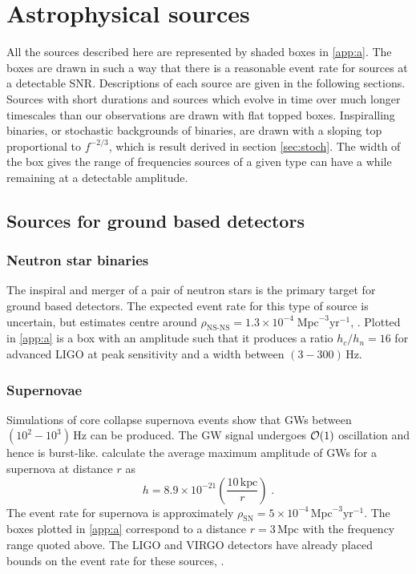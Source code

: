 \section{Astrophysical sources}\label{sec:sources}
All the sources described here are represented by shaded boxes in \ref{app:a}. The boxes are drawn in such a way that there is a reasonable event rate for sources at a detectable SNR. Descriptions of each source are given in the following sections. Sources with short durations and sources which evolve in time over much longer timescales than our observations are drawn with flat topped boxes. Inspiralling binaries, or stochastic backgrounds of binaries, are drawn with a sloping top proportional to $f^{-2/3}$, which is result derived in section \ref{sec:stoch}. The width of the box gives the range of frequencies sources of a given type can have a while remaining at a detectable amplitude.




\subsection{Sources for ground based detectors}

\subsubsection{Neutron star binaries}
The inspiral and merger of a pair of neutron stars is the primary target for ground based detectors. The expected event rate for this type of source is uncertain, but estimates centre around $\rho_{\textrm{NS-NS}}=1.3\times 10^{-4}\;\textrm{Mpc}^{-3}\textrm{yr}^{-1}$, \cite{CBC}. Plotted in \ref{app:a} is a box with an amplitude such that it produces a ratio $h_{c}/h_{n}=16$ for advanced LIGO at peak sensitivity and a width between $(3-300)\,\textrm{Hz}$.

\subsubsection{Supernovae}
Simulations of core collapse supernova events show that GWs between $(10^{2}-10^{3})\,\textrm{Hz}$ can be produced. The GW signal undergoes ${\cal{O}}(1)$ oscillation and hence is burst-like. \cite{2002A&A...393..523D} calculate the average maximum amplitude of GWs for a supernova at distance $r$ as
\begin{equation} h=8.9\times 10^{-21}\left( \frac{10 \,\textrm{kpc}}{r} \right) \; .\end{equation}
The event rate for supernova is approximately $\rho_{\textrm{SN}}=5\times10^{-4}\,\textrm{Mpc}^{-3}\textrm{yr}^{-1}$. The boxes plotted in \ref{app:a} correspond to a distance $r=3 \,\textrm{Mpc}$ with the frequency range quoted above. The LIGO and VIRGO detectors have already placed bounds on the event rate for these sources, \cite{Bursts}.

